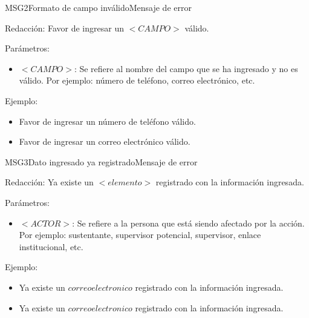  
\begin{mensaje}{MSG2}{Formato de campo inválido}{Mensaje de error}
	\item[Redacción:] Favor de ingresar un $<CAMPO>$  válido.
    \item[Parámetros:] 
    \begin{itemize}
        
        \item $<CAMPO>$: Se refiere al nombre del campo que se ha ingresado y no es válido. Por ejemplo: número de teléfono, correo electrónico, etc.
    \end{itemize}   

    \item[Ejemplo:]  \begin{itemize}
        \item  Favor de ingresar un número de teléfono  válido.
        \item  Favor de ingresar un correo electrónico válido.
    \end{itemize} 
\end{mensaje}


\begin{mensaje}{MSG3}{Dato ingresado ya registrado}{Mensaje de error}
	\item[Redacción:] Ya existe un $<elemento>$ registrado con la información ingresada.
	
	
	\item[Parámetros:] 
    \begin{itemize}
        \item $<ACTOR>$: Se refiere a la persona que está siendo afectado por la acción. Por ejemplo: sustentante, supervisor potencial, supervisor, enlace institucional, etc.
    \end{itemize}   

    \item[Ejemplo:]  
    \begin{itemize}
        \item  Ya existe un $correo electronico$ registrado con la información ingresada.
	
        \item  Ya existe un $correo electronico$ registrado con la información ingresada.
	
    \end{itemize} 
\end{mensaje}

